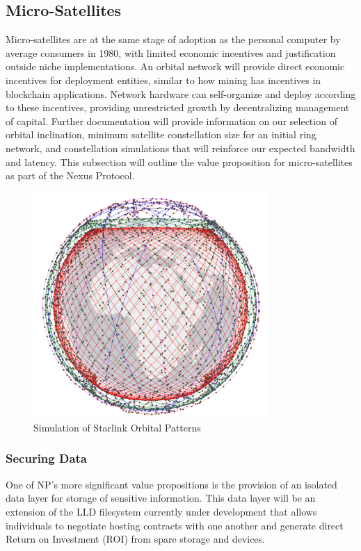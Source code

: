 \documentclass[11pt]{article}
\begin{document}
\subsection{Micro-Satellites}

Micro-satellites are at the same stage of adoption as the personal computer by average consumers in 1980, with limited economic incentives and justification outside niche implementations.
An orbital network will provide direct economic incentives for deployment entities, similar to how mining has incentives in blockchain applications.
Network hardware can self-organize and deploy according to these incentives, providing unrestricted growth by decentralizing management of capital.
Further documentation will provide information on our selection of orbital inclination, minimum satellite constellation size for an initial ring network, and constellation simulations that will reinforce our expected bandwidth and latency.
This subsection will outline the value proposition for micro-satellites as part of the Nexus Protocol.


\begin{figure}[h]
    \centering
    \includegraphics[width=0.8\textwidth]{./images/rsz_starlink.png} 
    \caption{Simulation of Starlink Orbital Patterns \cite{starlink}}
\end{figure}


\subsubsection{Securing Data}

One of NP's more significant value propositions is the provision of an isolated data layer for storage of sensitive information.
This data layer will be an extension of the LLD filesystem currently under development that allows individuals to negotiate hosting contracts with one another and generate direct Return on Investment (ROI) from spare storage and devices. \\
\end{document}
